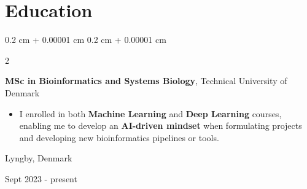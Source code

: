 \documentclass[10pt, letterpaper]{article}
\newenvironment{highlights}{
    \begin{itemize}[
        topsep=0.10 cm,
        parsep=0.10 cm,
        partopsep=0pt,
        itemsep=0pt,
        leftmargin=0.4 cm + 10pt
    ]
}{
    \end{itemize}
} %
\newenvironment{onecolentry}{
    \begin{adjustwidth}{
        0.2 cm + 0.00001 cm
    }{
        0.2 cm + 0.00001 cm
    }
}{
    \end{adjustwidth}
} %
\newenvironment{twocolentry}[2][]{
    \onecolentry
    \def\secondColumn{#2}
    \setcolumnwidth{\fill, 4.5 cm}
    \begin{paracol}{2}
}{
    \switchcolumn \raggedleft \secondColumn
    \end{paracol}
    \endonecolentry
} %
\let\hrefWithoutArrow\href
\renewcommand{\href}[2]{\hrefWithoutArrow{#1}{\ifthenelse{\equal{#2}{}}{ }{#2 }\raisebox{.15ex}{\footnotesize \faExternalLink*}}}
\begin{document}
        

          






    \section{Education}



        
        \begin{twocolentry}{
    Lyngby, Denmark

    Sept 2023 - present
}
    \textbf{MSc in Bioinformatics and Systems Biology}, Technical University of Denmark
    \begin{highlights}
        \item I enrolled in both \textbf{Machine Learning} and \textbf{Deep Learning} courses, enabling me to develop an \textbf{AI-driven mindset} when formulating projects and developing new bioinformatics pipelines or tools. 
    \end{highlights}
\end{twocolentry}
\end{document}
